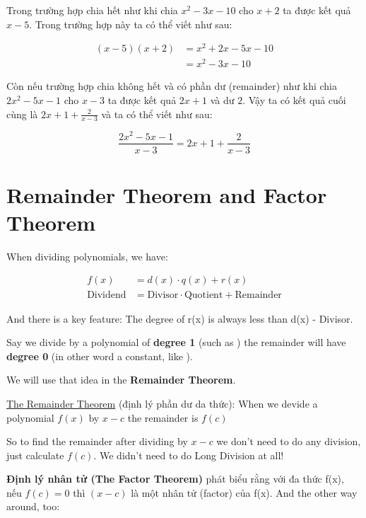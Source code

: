 Trong trường hợp chia hết như khi chia $x^{2}-3x-10$ cho $x+2$ ta được kết quả $x-5$. Trong trường hợp này ta có thể viết như sau:

\[
  \begin{aligned}
    (x-5)(x+2)&= x^{2}+2x-5x-10\\
    &=x^{2}-3x-10
  \end{aligned}
\]

Còn nếu trường hợp chia không hết và có phần dư (remainder) như khi chia $2x^{2}-5x-1$ cho $x-3$ ta được kết quả $2x+1$ và dư $2$. Vậy ta có kết quả cuối cùng là $2x+1+\frac{2}{x-3}$ và ta có thể viết như sau:

\[
  \frac{2x^{2}-5x-1}{x-3}=2x+1+\frac{2}{x-3}
\]

\section{Remainder Theorem and Factor Theorem}

When dividing polynomials, we have:

\[
  \begin{aligned}
    f(x)&=d(x) \cdot q(x) + r(x)\\
    \text{Dividend} &= \text{Divisor} \cdot \text{Quotient} + \text{Remainder}
  \end{aligned}
\]

And there is a key feature: The degree of r(x) is always less than d(x) - Divisor.

Say we divide by a polynomial of \textbf{degree 1} (such as ) the remainder will have \textbf{degree 0} (in other word a constant, like ).

We will use that idea in the \textbf{Remainder Theorem}.

\vspace{10 mm}

\href{https://www.mathsisfun.com/algebra/polynomials-remainder-factor.html}{The Remainder Theorem} (định lý phần dư da thức): When we devide a polynomial $f(x)$ by $x-c$ the remainder is $f(c)$

So to find the remainder after dividing by $x-c$ we don't need to do any division, just calculate $f(c)$. We didn't need to do Long Division at all!

\vspace{10 mm}

\textbf{Định lý nhân tử (The Factor Theorem)} phát biểu rằng với đa thức f(x), nếu $f(c) = 0$ thì $(x - c)$ là một nhân tử (factor) của f(x). And the other way around, too:

